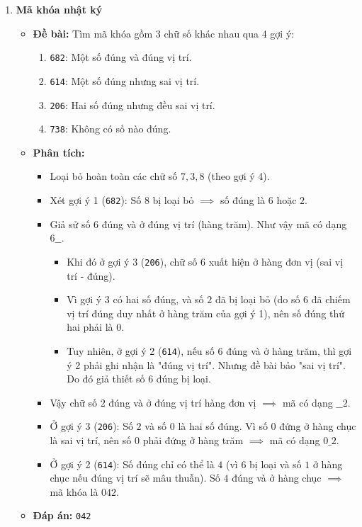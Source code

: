 \documentclass[11pt,a4paper]{article}
\begin{document}
\begin{enumerate}[label=\textbf{Câu \arabic*:}, leftmargin=*]
\hrule
\vspace{0.5cm}

\item \textbf{Mã khóa nhật ký}
    \begin{itemize}
        \item \textbf{Đề bài:} Tìm mã khóa gồm 3 chữ số khác nhau qua 4 gợi ý:
            \begin{enumerate}
                \item \texttt{682}: Một số đúng và đúng vị trí.
                \item \texttt{614}: Một số đúng nhưng sai vị trí.
                \item \texttt{206}: Hai số đúng nhưng đều sai vị trí.
                \item \texttt{738}: Không có số nào đúng.
            \end{enumerate}
        \item \textbf{Phân tích:}
            \begin{itemize}
                \item Loại bỏ hoàn toàn các chữ số $7, 3, 8$ (theo gợi ý 4).
                \item Xét gợi ý 1 (\texttt{682}): Số $8$ bị loại bỏ $\implies$ số đúng là $6$ hoặc $2$.
                \item Giả sử số $6$ đúng và ở đúng vị trí (hàng trăm). Như vậy mã có dạng $6\_ \_$.
                    \begin{itemize}
                        \item Khi đó ở gợi ý 3 (\texttt{206}), chữ số $6$ xuất hiện ở hàng đơn vị (sai vị trí - đúng).
                        \item Vì gợi ý 3 có hai số đúng, và số $2$ đã bị loại bỏ (do số $6$ đã chiếm vị trí đúng duy nhất ở hàng trăm của gợi ý 1), nên số đúng thứ hai phải là $0$.
                        \item Tuy nhiên, ở gợi ý 2 (\texttt{614}), nếu số $6$ đúng và ở hàng trăm, thì gợi ý 2 phải ghi nhận là "đúng vị trí". Nhưng đề bài bảo "sai vị trí". Do đó giả thiết số $6$ đúng bị loại.
                    \end{itemize}
                \item Vậy chữ số $2$ đúng và ở đúng vị trí hàng đơn vị $\implies$ mã có dạng $\_ \_ 2$.
                \item Ở gợi ý 3 (\texttt{206}): Số $2$ và số $0$ là hai số đúng. Vì số $0$ đứng ở hàng chục là sai vị trí, nên số $0$ phải đứng ở hàng trăm $\implies$ mã có dạng $0 \_ 2$.
                \item Ở gợi ý 2 (\texttt{614}): Số đúng chỉ có thể là $4$ (vì $6$ bị loại và số $1$ ở hàng chục nếu đúng vị trí sẽ mâu thuẫn). Số $4$ đúng và ở hàng chục $\implies$ mã khóa là $042$.
            \end{itemize}
        \item \textbf{Đáp án:} \texttt{042}
    \end{itemize}


\end{enumerate}
\end{document}
